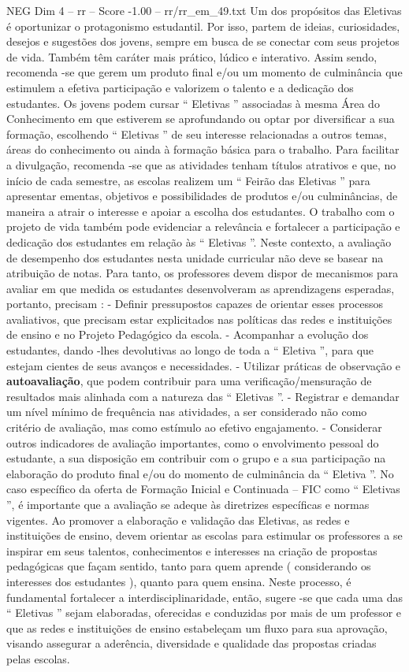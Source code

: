 \begin{textsample}{NEG Dim 4 – rr – Score -1.00 – rr/rr\_em\_49.txt}
Um dos propósitos das Eletivas é oportunizar o protagonismo estudantil.
Por isso, partem de ideias, curiosidades, desejos e sugestões dos jovens, sempre em busca de se conectar com seus projetos de vida.
Também têm caráter mais prático, lúdico e interativo.
Assim sendo, recomenda -se que gerem um produto final e/ou um momento de culminância que estimulem a efetiva participação e valorizem o talento e a dedicação dos estudantes.
Os jovens podem cursar “ Eletivas ” associadas à mesma Área do Conhecimento em que estiverem se aprofundando ou optar por diversificar a sua formação, escolhendo “ Eletivas ” de seu interesse relacionadas a outros temas, áreas do conhecimento ou ainda à formação básica para o trabalho.
Para facilitar a divulgação, recomenda -se que as atividades tenham títulos atrativos e que, no início de cada semestre, as escolas realizem um “ Feirão das Eletivas ” para apresentar ementas, objetivos e possibilidades de produtos e/ou culminâncias, de maneira a atrair o interesse e apoiar a escolha dos estudantes.
O trabalho com o projeto de vida também pode evidenciar a relevância e fortalecer a participação e dedicação dos estudantes em relação às “ Eletivas ”.
Neste contexto, a avaliação de desempenho dos estudantes nesta unidade curricular não deve se basear na atribuição de notas.
Para tanto, os professores devem dispor de mecanismos para avaliar em que medida os estudantes desenvolveram as aprendizagens esperadas, portanto, precisam : - Definir pressupostos capazes de orientar esses processos avaliativos, que precisam estar explicitados nas políticas das redes e instituições de ensino e no Projeto Pedagógico da escola. - Acompanhar a evolução dos estudantes, dando -lhes devolutivas ao longo de toda a “ Eletiva ”, para que estejam cientes de seus avanços e necessidades. - Utilizar práticas de observação e \textbf{autoavaliação}, que podem contribuir para uma verificação/mensuração de resultados mais alinhada com a natureza das “ Eletivas ”. - Registrar e demandar um nível mínimo de frequência nas atividades, a ser considerado não como critério de avaliação, mas como estímulo ao efetivo engajamento. - Considerar outros indicadores de avaliação importantes, como o envolvimento pessoal do estudante, a sua disposição em contribuir com o grupo e a sua participação na elaboração do produto final e/ou do momento de culminância da “ Eletiva ”.
No caso específico da oferta de Formação Inicial e Continuada – FIC como “ Eletivas ”, é importante que a avaliação se adeque às diretrizes específicas e normas vigentes.
Ao promover a elaboração e validação das Eletivas, as redes e instituições de ensino, devem orientar as escolas para estimular os professores a se inspirar em seus talentos, conhecimentos e interesses na criação de propostas pedagógicas que façam sentido, tanto para quem aprende ( considerando os interesses dos estudantes ), quanto para quem ensina.
Neste processo, é fundamental fortalecer a interdisciplinaridade, então, sugere -se que cada uma das “ Eletivas ” sejam elaboradas, oferecidas e conduzidas por mais de um professor e que as redes e instituições de ensino estabeleçam um fluxo para sua aprovação, visando assegurar a aderência, diversidade e qualidade das propostas criadas pelas escolas.

\end{textsample}
